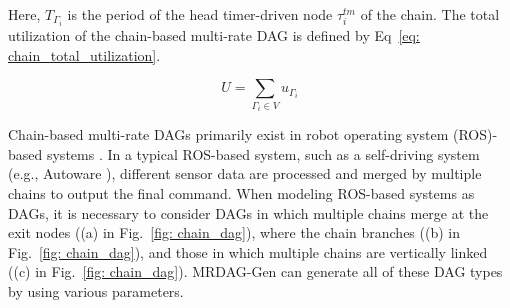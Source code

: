 \noindent Here, $T_{\Gamma_i}$ is the period of the head timer-driven node $\tau^{tm}_i$ of the chain.
The total utilization of the chain-based multi-rate DAG is defined by Eq~\ref{eq: chain_total_utilization}.

\begin{equation}
    \label{eq: chain_total_utilization}
    U = \sum_{\Gamma_i \in V}u_{\Gamma_i}
\end{equation}

Chain-based multi-rate DAGs primarily exist in robot operating system (ROS)-based systems \cite{casini2019response, choi2021picas}.
In a typical ROS-based system, such as a self-driving system (e.g., Autoware \cite{future}), different sensor data are processed and merged by multiple chains to output the final command.
When modeling ROS-based systems as DAGs, it is necessary to consider DAGs in which multiple chains merge at the exit nodes ((a) in Fig.~\ref{fig: chain_dag}), where the chain branches ((b) in Fig.~\ref{fig: chain_dag}), and those in which multiple chains are vertically linked ((c) in Fig.~\ref{fig: chain_dag}).
MRDAG-Gen can generate all of these DAG types by using various parameters.
